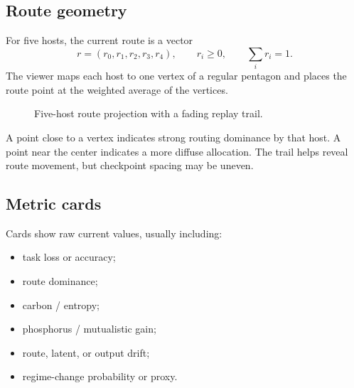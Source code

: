 \documentclass[11pt,a4paper]{article}
\begin{document}
\subsection{Route geometry}

For five hosts, the current route is a vector
\[
  r = (r_0,r_1,r_2,r_3,r_4), \qquad r_i\ge 0, \qquad \sum_i r_i=1.
\]
The viewer maps each host to one vertex of a regular pentagon and places the route point at the weighted average of the vertices.

\begin{figure}[h]
\centering
{}
\caption{Five-host route projection with a fading replay trail.}
\end{figure}

A point close to a vertex indicates strong routing dominance by that host. A point near the center indicates a more diffuse allocation. The trail helps reveal route movement, but checkpoint spacing may be uneven.

\subsection{Metric cards}

Cards show raw current values, usually including:

\begin{itemize}
  \item task loss or accuracy;
  \item route dominance;
  \item carbon / entropy;
  \item phosphorus / mutualistic gain;
  \item route, latent, or output drift;
  \item regime-change probability or proxy.
\end{itemize}
\end{document}
